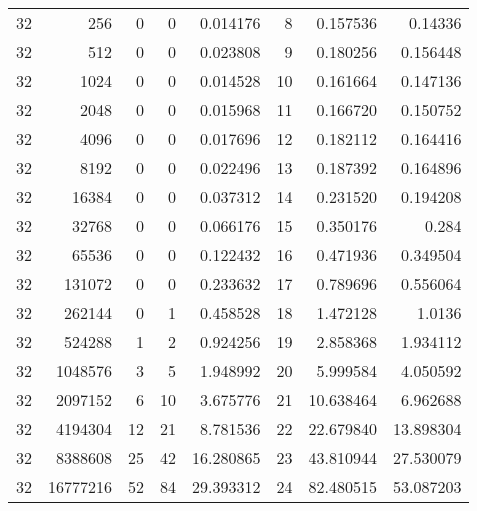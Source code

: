 \begin{longtable}[c]{@{}rrrrrrrr@{}}
    32        & 256       & 0         & 0        & 0.014176    & 8                   & 0.157536    & 0.14336    \\
    32        & 512       & 0         & 0        & 0.023808    & 9                   & 0.180256    & 0.156448   \\
    32        & 1024      & 0         & 0        & 0.014528    & 10                  & 0.161664    & 0.147136   \\
    32        & 2048      & 0         & 0        & 0.015968    & 11                  & 0.166720    & 0.150752   \\
    32        & 4096      & 0         & 0        & 0.017696    & 12                  & 0.182112    & 0.164416   \\
    32        & 8192      & 0         & 0        & 0.022496    & 13                  & 0.187392    & 0.164896   \\
    32        & 16384     & 0         & 0        & 0.037312    & 14                  & 0.231520    & 0.194208   \\
    32        & 32768     & 0         & 0        & 0.066176    & 15                  & 0.350176    & 0.284      \\
    32        & 65536     & 0         & 0        & 0.122432    & 16                  & 0.471936    & 0.349504   \\
    32        & 131072    & 0         & 0        & 0.233632    & 17                  & 0.789696    & 0.556064   \\
    32        & 262144    & 0         & 1        & 0.458528    & 18                  & 1.472128    & 1.0136     \\
    32        & 524288    & 1         & 2        & 0.924256    & 19                  & 2.858368    & 1.934112   \\
    32        & 1048576   & 3         & 5        & 1.948992    & 20                  & 5.999584    & 4.050592   \\
    32        & 2097152   & 6         & 10       & 3.675776    & 21                  & 10.638464   & 6.962688   \\
    32        & 4194304   & 12        & 21       & 8.781536    & 22                  & 22.679840   & 13.898304  \\
    32        & 8388608   & 25        & 42       & 16.280865   & 23                  & 43.810944   & 27.530079  \\
    32        & 16777216  & 52        & 84       & 29.393312   & 24                  & 82.480515   & 53.087203  \\

\end{longtable}
